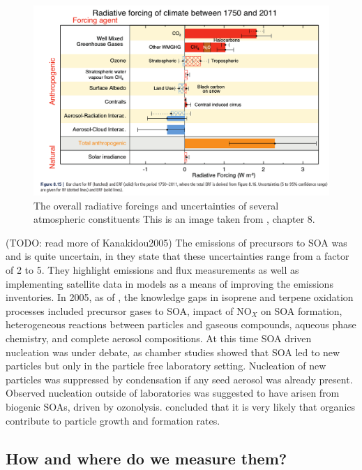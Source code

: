       \begin{figure}
        \includegraphics[width=\textwidth]{Figures/IPCC_WG1AR5_RFSummary.png}
        \caption{%
          The overall radiative forcings and uncertainties of several atmospheric constituents
  	      This is an image taken from \cite{IPCC_AR5_WG1}, chapter 8.}
        \label{LR:fig:IPCC_RF_AR5}
      \end{figure}    
      
      (TODO: read more of Kanakidou2005)
      The emissions of precursors to SOA was and is quite uncertain, in \cite{Kanakidou2005} they state that these uncertainties range from a factor of 2 to 5.
      They highlight emissions and flux measurements as well as implementing satellite data in models as a means of improving the emissions inventories.
      In 2005, as of \cite{Kanakidou2005}, the knowledge gaps in isoprene and terpene oxidation processes included precursor gases to SOA, impact of NO$_X$ on SOA formation, heterogeneous reactions between particles and gaseous compounds, aqueous phase chemistry, and complete aerosol compositions.
      At this time SOA driven nucleation was under debate, as chamber studies showed that SOA led to new particles but only in the particle free laboratory setting. 
      Nucleation of new particles was suppressed by condensation if any seed aerosol was already present.
      Observed nucleation outside of laboratories was suggested to have arisen from biogenic SOAs, driven by ozonolysis.
      \cite{Kanakidou2005} concluded that it is very likely that organics contribute to particle growth and formation rates.
    
  \subsection{How and where do we measure them?}

